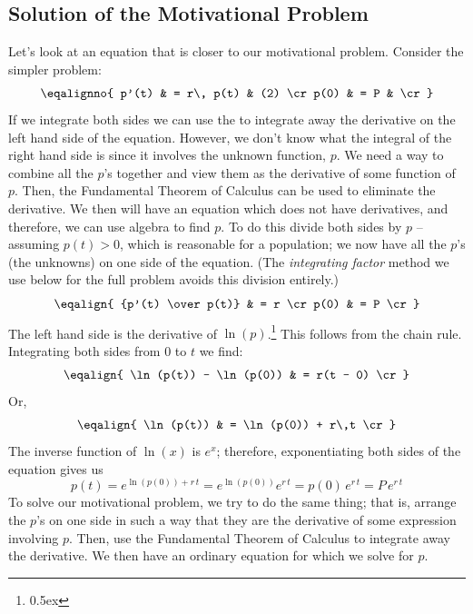 \subsection{Solution of the Motivational Problem}
Let's look at an equation that is closer to our motivational problem.
Consider the simpler problem:
$$
\eqalignno{
p'(t) & =  r\, p(t) & (2) \cr
p(0) & = P & \cr
}
$$
If we integrate both sides we can use the  
to integrate away the derivative on the left hand side of the equation.
However, we don't know what the integral of the right hand side is since it
involves the unknown function, $p$.
We need a way to combine all the $p$'s together and view them as the 
derivative of some function of $p$. Then, the Fundamental Theorem 
of Calculus can be used to eliminate the derivative. We then will have an 
equation which does not have derivatives, and therefore, we can use algebra 
to find $p$. To do this
divide both sides by $p$ -- assuming $p(t) > 0$, which is reasonable for a
population; we now have all the $p$'s (the unknowns) on one side
of the equation. (The {\it integrating factor\/} method we use below for the
full problem avoids this division entirely.)
$$
\eqalign{
{p'(t) \over p(t)} & =  r  \cr
p(0) & = P \cr
}
$$
The left hand side is the derivative of $\ln(p)$.\footnote{\kern 0.5pt \raise 0.5ex \hbox{\ddag}}
{This follows from the chain rule.} Integrating 
both sides from $0$ to $t$ we find:
$$
\eqalign{
\ln(p(t)) - \ln(p(0)) & =  r(t - 0) \cr
}
$$
Or,
$$
\eqalign{
\ln(p(t)) & = \ln(p(0)) + r\,t \cr
}
$$
The inverse function of $\ln(x)$ is $e^x$; therefore, exponentiating 
both sides of the equation gives us
$$
p(t) = e^{\ln(p(0)) + r\,t}  = e^{\ln(p(0))} e^{r\, t} = p(0) \,e^{r \,t} = P \, e^{r \,t}
$$
To solve our motivational problem, we try to do the same thing; that is,
arrange the $p$'s on one side in such a way that they are the derivative 
of some expression involving $p$. Then, use the Fundamental Theorem of Calculus to 
integrate away the derivative. We then have an ordinary equation for which 
we solve for $p$. 

